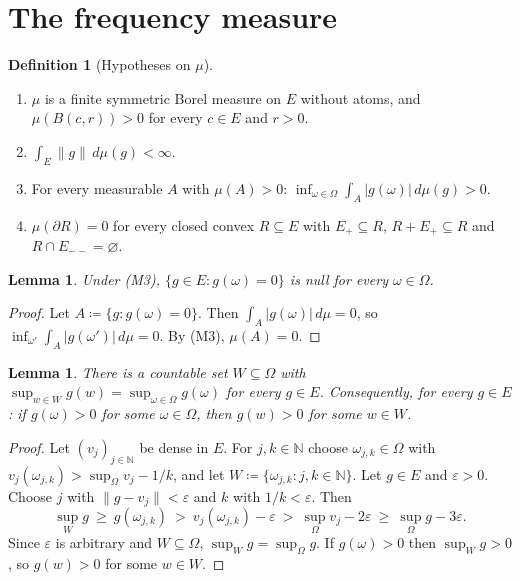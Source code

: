\documentclass[11pt]{article}
\newtheorem{lemma}[theorem]{Lemma}
\theoremstyle{definition}
\newtheorem{definition}[theorem]{Definition}
\newcommand{\N}{\mathbb N}
\newcommand{\bd}{\partial}
\begin{document}
\section{The frequency measure}\label{sec:measure}

\begin{definition}[Hypotheses on $\mu$]\label{def:hypotheses}
\begin{enumerate}[label=(M\arabic*)]
\item $\mu$ is a finite symmetric Borel measure on $E$ without atoms, and $\mu(B(c,r))>0$ for every $c\in E$ and $r>0$.
\item $\int_E\|g\|\,d\mu(g)<\infty$.
\item For every measurable $A$ with $\mu(A)>0$: $\inf_{\omega\in\Omega}\int_A|g(\omega)|\,d\mu(g)>0$.
\item $\mu(\bd R)=0$ for every closed convex $R\subseteq E$ with $E_+\subseteq R$, $R+E_+\subseteq R$ and $R\cap E_{--}=\varnothing$.
\end{enumerate}
\end{definition}

\begin{lemma}\label{lem:hyperplane}
Under (M3), $\{g\in E:g(\omega)=0\}$ is null for every $\omega\in\Omega$.
\end{lemma}
\begin{proof}
Let $A\coloneqq\{g:g(\omega)=0\}$. Then $\int_A|g(\omega)|\,d\mu=0$, so $\inf_{\omega'}\int_A|g(\omega')|\,d\mu=0$. By (M3), $\mu(A)=0$.
\end{proof}

\begin{lemma}\label{lem:detecting}
There is a countable set $W\subseteq\Omega$ with $\sup_{w\in W}g(w)=\sup_{\omega\in\Omega}g(\omega)$ for every $g\in E$. Consequently, for every $g\in E$: if $g(\omega)>0$ for some $\omega\in\Omega$, then $g(w)>0$ for some $w\in W$.
\end{lemma}
\begin{proof}
Let $(v_j)_{j\in\N}$ be dense in $E$. For $j,k\in\N$ choose $\omega_{j,k}\in\Omega$ with $v_j(\omega_{j,k})>\sup_\Omega v_j-1/k$, and let $W\coloneqq\{\omega_{j,k}:j,k\in\N\}$. Let $g\in E$ and $\varepsilon>0$. Choose $j$ with $\|g-v_j\|<\varepsilon$ and $k$ with $1/k<\varepsilon$. Then
\[
\sup_Wg\ \ge\ g(\omega_{j,k})\ >\ v_j(\omega_{j,k})-\varepsilon\ >\ \sup_\Omega v_j-2\varepsilon\ \ge\ \sup_\Omega g-3\varepsilon.
\]
Since $\varepsilon$ is arbitrary and $W\subseteq\Omega$, $\sup_Wg=\sup_\Omega g$. If $g(\omega)>0$ then $\sup_Wg>0$, so $g(w)>0$ for some $w\in W$.
\end{proof}
\end{document}
